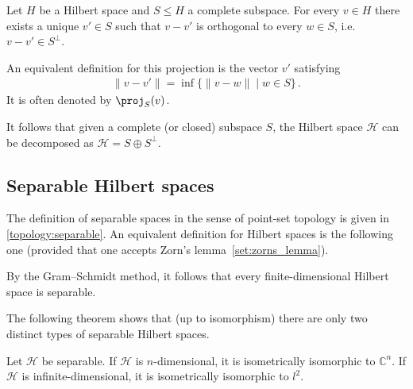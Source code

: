     \begin{theorem}\label{functional:projection_theorem}
        Let $H$ be a Hilbert space and $S\leq H$ a complete subspace. For every $v\in H$ there exists a unique $v'\in S$ such that $v-v'$ is orthogonal to every $w\in S$, i.e.~$v-v'\in S^\perp$.
    \end{theorem}
    \begin{remark}
        An equivalent definition for this projection is the vector $v'$ satisfying
        \begin{gather}
            \|v-v'\| = \inf\{\|v-w\|\mid w\in S\}\,.
        \end{gather}
        It is often denoted by $\proj_S(v)$.
    \end{remark}
    \begin{result}
        It follows that given a complete (or closed) subspace $S$, the Hilbert space $\mathcal{H}$ can be decomposed as $\mathcal{H}=S\oplus S^\perp$.
    \end{result}


\subsection{Separable Hilbert spaces}

    The definition of separable spaces in the sense of point-set topology is given in \cref{topology:separable}. An equivalent definition for Hilbert spaces is the following one (provided that one accepts Zorn's lemma~\ref{set:zorns_lemma}).
    \begin{example}
        By the Gram--Schmidt method, it follows that every finite-dimensional Hilbert space is separable.
    \end{example}

    The following theorem shows that (up to isomorphism) there are only two distinct types of separable Hilbert spaces.
    \begin{theorem}
        Let $\mathcal{H}$ be separable. If $\mathcal{H}$ is $n$-dimensional, it is isometrically isomorphic to $\mathbb{C}^n$. If $\mathcal{H}$ is infinite-dimensional, it is isometrically isomorphic to $l^2$.
    \end{theorem}

